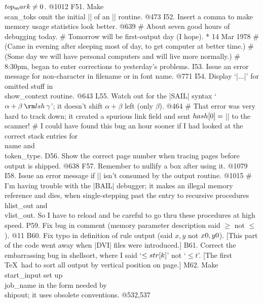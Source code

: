 	$\\{top_mark}\ne0$. @1012
F51. Make \\{scan_toks} omit the initial |{| of an |\output| routine. @473
I52. Insert a comma to make memory usage statistics look better. @639
# About seven good hours of debugging today.
# Tomorrow will be first-output day (I hope).
* 14 Mar 1978
# (Came in evening after sleeping most of day, to get computer at better time.)
# (Some day we will have personal computers and will live more normally.)
# 8:30pm, began to enter corrections to yesterday's problems.
I53. Issue an error message for non-character in filename or in font name. @771
I54. Display `|...|' for omitted stuff in \\{show_context} routine. @643
L55. Watch out for the |SAIL| syntax `$\alpha+\beta\mathbin{\rm lsh}\gamma$';
	it doesn't shift $\alpha+\beta$ left (only $\beta$). @464
# That error was very hard to track down; it created a spurious link field
	and sent $\\{hash}[0]=\null$|\beta| to the scanner!
# I could have found this bug an hour sooner if I had looked at the correct
	stack entries for \\{name} and \\{token_type}.
D56. Show the correct page number when tracing pages before output is shipped. @638
F57. Remember to nullify a box after using it. @1079
I58. Issue an error message if\/ || isn't consumed by the output routine. @1015
# I'm having trouble with the |BAIL| debugger;
	it makes an illegal memory reference and dies,
	when single-stepping past the entry to recursive procedures
	\\{hlist_out} and \\{vlist_out}.  So I have to reload and be careful
	to go thru these procedures at high speed.
P59. Fix bug in comment (memory parameter description said $\ge$ not $\le$). @11
B60. Fix typo in definition of rule output (said $x,y$ not $\\{x0},\\{y0}$).
	[This part of the code went away when |DVI| files were introduced.]
B61. Correct the embarrassing bug in shellsort, where I said `$\le\\{str}[k]$'
	not `$\le t$'.
	[The first \TeX\ had to sort all output by vertical position on page.]
M62. Make \\{start_input} set up \\{job_name} in the form needed by \\{shipout};
	it uses obsolete conventions. @532,537
}
